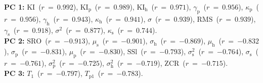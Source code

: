 {\bf{PC 1:}} $\textrm{KI}$~($r~=~{0.992}$), $\textrm{KI}_{\textrm{p}}$~($r~=~{0.989}$), $\textrm{KI}_{\textrm{h}}$~($r~=~{0.971}$), $\gamma_{\textrm{p}}$~($r~=~{0.956}$), $\kappa_{\textrm{p}}$~($r~=~{0.956}$), $\gamma_{\textrm{h}}$~($r~=~{0.943}$), $\kappa_{\textrm{h}}$~($r~=~{0.941}$), $\sigma$~($r~=~{0.939}$), $\textrm{RMS}$~($r~=~{0.939}$), $\gamma_{\textrm{s}}$~($r~=~{0.918}$), $\sigma^{2}$~($r~=~{0.877}$), $\kappa_{\textrm{s}}$~($r~=~{0.744}$).\vspace{0.5em}\\
{\bf{PC 2:}} $\textrm{SRO}$~($r~=~{-0.913}$), $\mu_{\textrm{s}}$~($r~=~{-0.901}$), $\sigma_{\textrm{h}}$~($r~=~{-0.869}$), $\mu_{\textrm{h}}$~($r~=~{-0.832}$), $\sigma_{\textrm{p}}$~($r~=~{-0.831}$), $\mu_{\textrm{p}}$~($r~=~{-0.830}$), $\textrm{SSl}$~($r~=~{-0.793}$), $\sigma_{\textrm{s}}^{2}$~($r~=~{-0.764}$), $\sigma_{\textrm{s}}$~($r~=~{-0.761}$), $\sigma_{\textrm{p}}^{2}$~($r~=~{-0.725}$), $\sigma_{\textrm{h}}^{2}$~($r~=~{-0.719}$), $\textrm{ZCR}$~($r~=~{-0.715}$).\vspace{0.5em}\\
{\bf{PC 3:}} $T_{1}$~($r~=~{-0.797}$), $T_{\textrm{p}1}$~($r~=~{-0.783}$).
